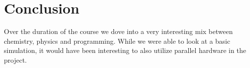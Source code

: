\chapter{Conclusion}
\begin{comment}
- give look at stuff i did and did not
- mention all the other cool stuff, parralell hardware memes domain decompasition looking at other mechanical parameters ia stress
- should be written nice if i wanna work with those guys
-btw the github is actually hilarious although a c++ project over 80%
\end{comment}

Over the duration of the course we dove into a very interesting mix between chemistry, physics and programming. While we were able to look at a basic simulation, it would have been interesting to also utilize parallel hardware in the project. 
